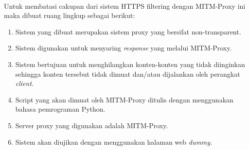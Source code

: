 \documentclass[../PROPOSAL_PRA_SKRIPSI_ALDZIKRI_DWIJAYANTO_PRATHAMA.tex]{subfiles}
\begin{document}
  \paragraph*{} Untuk membatasi cakupan dari sistem HTTPS filtering dengan
    MITM-Proxy ini maka dibuat ruang lingkup sebagai berikut:
    \begin{enumerate}
      \item Sistem yang dibuat merupakan sistem proxy yang
      bersifat non-transparent.
      \item Sistem digunakan untuk menyaring \textit{response}
      yang melalui MITM-Proxy.
      \item Sistem bertujuan untuk menghilangkan konten-konten
      yang tidak diinginkan sehingga konten tersebut tidak
      dimuat dan/atau dijalankan oleh perangkat \textit{client}.
      \item Script yang akan dimuat oleh MITM-Proxy ditulis
      dengan menggunakan bahasa pemrograman Python.
      \item Server proxy yang digunakan adalah MITM-Proxy.
      \item Sistem akan diujikan dengan menggunakan halaman
      web \textit{dummy}.
    \end{enumerate}
\end{document}
